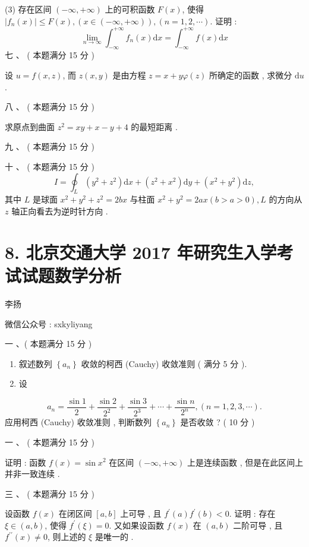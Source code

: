 \documentclass[10pt]{article}
\begin{document}
{(3)  存在区间  $(-\infty,+\infty)$  上的可积函数  $F(x)$,  使得  $\left|f_{n}(x)\right| \leqslant F(x),(x \in(-\infty,+\infty)),(n=1,2, \cdots)$.  证明 :
$$
\lim _{n \rightarrow \infty} \int_{-\infty}^{+\infty} f_{n}(x) \mathrm{d} x=\int_{-\infty}^{+\infty} f(x) \mathrm{d} x
$$
 七 、 ( 本题满分  15  分 )

 设  $u=f(x, z)$,  而  $z(x, y)$  是由方程  $z=x+y \varphi(z)$  所确定的函数 ,  求微分  $\mathrm{d} u$.

 八 、 ( 本题满分  15  分 )

 求原点到曲面  $z^{2}=x y+x-y+4$  的最短距离 .

 九 、 ( 本题满分  15  分 )

 十 、 ( 本题满分  15  分 )
$$
I=\oint_{L}\left(y^{2}+z^{2}\right) \mathrm{d} x+\left(z^{2}+x^{2}\right) \mathrm{d} y+\left(x^{2}+y^{2}\right) \mathrm{d} z,
$$
 其中  $L$  是球面  $x^{2}+y^{2}+z^{2}=2 b x$  与柱面  $x^{2}+y^{2}=2 a x(b>a>0), L$  的方向从  $z$  轴正向看去为逆时针方向 .

\section{8. 北京交通大学 2017 年研究生入学考试试题数学分析}
 李扬 

 微信公众号 : sxkyliyang

 一 、( 本题满分  15  分 )

\begin{enumerate}
  \item  叙述数列  $\left\{a_{n}\right\}$  收敛的柯西  (Cauchy)  收敛准则  ( 满分  5  分 ).

  \item  设 

\end{enumerate}
$$
a_{n}=\frac{\sin 1}{2}+\frac{\sin 2}{2^{2}}+\frac{\sin 3}{2^{3}}+\cdots+\frac{\sin n}{2^{n}},(n=1,2,3, \cdots) .
$$
 应用柯西  (Cauchy)  收敛准则 ,  判断数列  $\left\{a_{n}\right\}$  是否收敛 ? ( 10  分 )

 一 、 ( 本题满分  15  分 )

 证明 :  函数  $f(x)=\sin x^{2}$  在区间  $(-\infty,+\infty)$  上是连续函数 ,  但是在此区间上并非一致连续 .

 三 、 ( 本题满分  15  分 )

 设函数  $f(x)$  在闭区间  $[a, b]$  上可导 ,  且  $f^{\prime}(a) f^{\prime}(b)<0$.  证明 :  存在  $\xi \in(a, b)$,  使得  $f^{\prime}(\xi)=0$.  又如果设函数  $f(x)$  在  $(a, b)$  二阶可导 ,  且  $f^{\prime \prime}(x) \neq 0$,  则上述的  $\xi$  是唯一的 .

}
\end{document}
